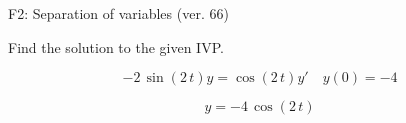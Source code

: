\begin{exercise}
  \begin{exerciseTitle}F2: Separation of variables (ver. 66)\end{exerciseTitle}
  \begin{exerciseStatement}
    
Find the solution to the given IVP.

    
\[-2 \, \sin\left(2 \, t\right) y= \cos\left(2 \, t\right) y'\hspace{1em} y\left( 0 \right)= -4\]

  \end{exerciseStatement}
  \begin{exerciseAnswer}
    
\[y= -4 \, \cos\left(2 \, t\right)\]

  \end{exerciseAnswer}
\end{exercise}